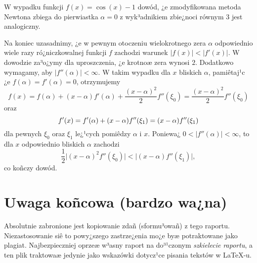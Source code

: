 \documentclass[a4paper,12pt]{article}
\begin{document}
W wypadku funkcji $f(x) = \cos(x) - 1$ dowód, ¿e zmodyfikowana metoda Newtona
zbiega do pierwiastka $\alpha = 0$ z wyk³adnikiem zbie¿noci równym $3$ jest analogiczny.

Na koniec uzasadnimy, ¿e w pewnym otoczeniu wielokrotnego zera $\alpha$ odpowiednio
wiele razy ró¿niczkowalnej funkcji $f$ zachodzi warunek $|f(x)| < |f'(x)|$. W dowodzie
za³o¿ymy dla uproszczenia, ¿e krotnoæ zera wynosi $2$. Dodatkowo wymagamy,
aby $|f''(\alpha)| < \infty$. W takim wypadku dla $x$ bliskich $\alpha$, pamiêtaj¹c
¿e $f(\alpha)=f'(\alpha)=0$, otrzymujemy
$$
  f(x) = f(\alpha) + (x-\alpha) f'(\alpha) + \frac{(x-\alpha)^2}{2} f''(\xi_0)
       = \frac{(x-\alpha)^2}{2} f''(\xi_0)
$$
oraz
$$
  f'(x) = f'(\alpha) + (x-\alpha) f''(\xi_1) = (x-\alpha) f''(\xi_1)
\vspace{0.5ex}
$$
dla pewnych $\xi_0$ oraz $\xi_1$ le¿¹cych pomiêdzy $\alpha$ i $x$. Poniewa¿
$0\! <\! |f''(\alpha)|\! <\! \infty$, to dla $x$ odpowiednio bliskich $\alpha$ zachodzi
$$
  \frac{1}{2} \big| (x-\alpha)^2 f''(\xi_0) \big| <
  \big| (x-\alpha) f''(\xi_1) \big|,
$$
co koñczy dowód.

\medskip


\section*{Uwaga koñcowa (bardzo wa¿na)}
Absolutnie zabronione jest kopiowanie zdañ (sformu³owañ) z tego raportu.
Niezastosowanie siê to powy¿szego zastrze¿enia mo¿e byæ potraktowane jako plagiat.
Najbezpieczniej oprzeæ w³asny raport na do³¹czonym \emph{szkielecie raportu}, a ten plik
traktowaæ jedynie jako wskazówki dotycz¹ce pisania tekstów w \LaTeX-u.
\end{document}
